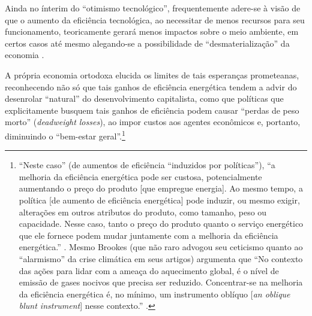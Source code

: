 

Ainda no ínterim do ``otimismo tecnológico'', frequentemente adere-se à visão de que o aumento da eficiência tecnológica, ao necessitar de menos recursos para seu funcionamento, teoricamente gerará menos impactos sobre o meio ambiente, em certos casos até mesmo alegando-se a possibilidade de ``desmaterialização'' da economia \parencite{SaBarreto2016}. 

A própria economia ortodoxa elucida os limites de tais esperanças prometeanas, reconhecendo não só que tais ganhos de eficiência energética tendem a advir do desenrolar ``natural'' do desenvolvimento capitalista, como que políticas que explicitamente busquem tais ganhos de eficiência podem causar ``perdas de peso morto'' (\textit{deadweight losses}), ao impor custos aos agentes econômicos e, portanto, diminuindo o ``bem-estar geral''.\footnote{``Neste caso'' (de aumentos de eficiência ``induzidos por políticas''), ``a melhoria da eficiência energética pode ser custosa, potencialmente aumentando o preço do produto [que empregue energia]. Ao mesmo tempo, a política [de aumento de eficiência energética] pode induzir, ou mesmo exigir, alterações em outros atributos do produto, como tamanho, peso ou capacidade. Nesse caso, tanto o preço do produto quanto o serviço energético que ele fornece podem mudar juntamente com a melhoria da eficiência energética.'' \parencite{Gillingham2015}. Mesmo Brookes (que não raro advogou seu ceticismo quanto ao ``alarmismo'' da crise climática em seus artigos) argumenta que ``No contexto das ações para lidar com a ameaça do aquecimento global, é o nível de emissão de gases nocivos que precisa ser reduzido. Concentrar-se na melhoria da eficiência energética é, no mínimo, um instrumento oblíquo [\textit{an oblique blunt instrument}] nesse contexto.'' \parencite[p. 365]{Brookes2000}.} 

